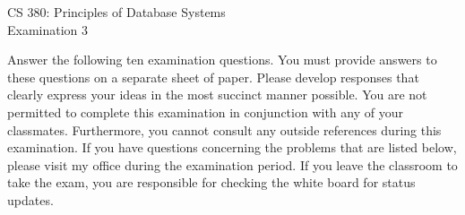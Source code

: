\documentclass[12pt]{article}
\def\widow#1{\vskip #1\vbadness10000\penalty-200\vskip-#1}
\begin{document}
\def\widow#1{\vskip #1\vbadness10000\penalty-200\vskip-#1}

\begin{center}

CS 380: Principles of Database Systems \\
Examination 3 \\

\end{center}

\noindent
Answer the following ten examination questions.  You must provide
answers to these questions on a separate sheet of paper.  Please
develop responses that clearly express your ideas in the most succinct
manner possible.  You are not permitted to complete this examination
in conjunction with any of your classmates.  Furthermore, you cannot
consult any outside references during this examination.  If you have
questions concerning the problems that are listed below, please visit
my office during the examination period.  If you leave the classroom
to take the exam, you are responsible for checking the white board for
status updates.

\end{document}
